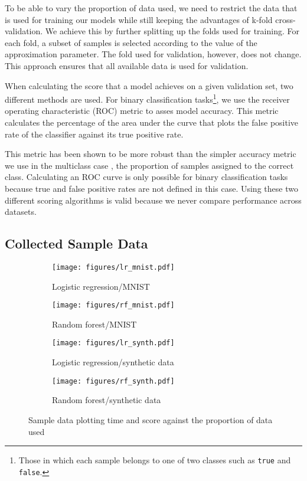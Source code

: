\documentclass[a4paper,12pt,twoside,openright]{report}
\begin{document}
To be able to vary the proportion of data used, we need to restrict the data that is used for training our models while still keeping the advantages of k-fold cross-validation. We achieve this by further splitting up the folds used for training. For each fold, a subset of samples is selected according to the value of the approximation parameter. The fold used for validation, however, does not change. This approach ensures that all available data is used for validation.

When calculating the score that a model achieves on a given validation set, two different methods are used. For binary classification tasks\footnote{Those in which each sample belongs to one of two classes such as \texttt{true} and \texttt{false}.}, we use the receiver operating characteristic (ROC) metric to asses model accuracy. This metric calculates the percentage of the area under the curve that plots the false positive rate of the classifier against its true positive rate. 

This metric has been shown to be more robust than the simpler accuracy metric we use in the multiclass case \cite{Bradley97theuse}, the proportion of samples assigned to the correct class. Calculating an ROC curve is only possible for binary classification tasks because true and false positive rates are not defined in this case. Using these two different scoring algorithms is valid because we never compare performance across datasets.





\subsection{Collected Sample Data}

\begin{figure}
\centering
\begin{subfigure}{.45\textwidth}
  \centering
  \texttt{[image: figures/lr\_mnist.pdf]}
  \caption{Logistic regression/MNIST}
  \label{sampledata1}
\end{subfigure}%
\begin{subfigure}{.45\textwidth}
  \centering
  \texttt{[image: figures/rf\_mnist.pdf]}
  \caption{Random forest/MNIST}
  \label{sampledata2}
\end{subfigure}
\begin{subfigure}{.45\textwidth}
  \centering
  \texttt{[image: figures/lr\_synth.pdf]}
  \caption{Logistic regression/synthetic data}
  \label{sampledata3}
\end{subfigure}
\begin{subfigure}{.45\textwidth}
  \centering
  \texttt{[image: figures/rf\_synth.pdf]}
  \caption{Random forest/synthetic data}
  \label{sampledata4}
\end{subfigure}
\caption{Sample data plotting time and score against the proportion of data used}
\label{sampledata}
\end{figure}
\end{document}
